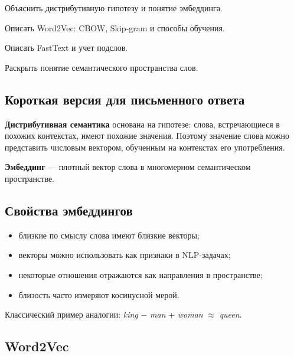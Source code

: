 
\begin{examplan}
    \item Объяснить дистрибутивную гипотезу и понятие эмбеддинга.
    \item Описать Word2Vec: CBOW, Skip-gram и способы обучения.
    \item Описать FastText и учет подслов.
    \item Раскрыть понятие семантического пространства слов.
\end{examplan}

\subsection*{Короткая версия для письменного ответа}

\textbf{Дистрибутивная семантика} основана на гипотезе: слова, встречающиеся в похожих контекстах, имеют похожие значения. Поэтому значение слова можно представить числовым вектором, обученным на контекстах его употребления.

\textbf{Эмбеддинг} --- плотный вектор слова в многомерном семантическом пространстве.

\subsection*{Свойства эмбеддингов}

\begin{itemize}
    \item близкие по смыслу слова имеют близкие векторы;
    \item векторы можно использовать как признаки в NLP-задачах;
    \item некоторые отношения отражаются как направления в пространстве;
    \item близость часто измеряют косинусной мерой.
\end{itemize}

Классический пример аналогии: \textit{king} $-$ \textit{man} $+$ \textit{woman} $\approx$ \textit{queen}.

\subsection*{Word2Vec}

